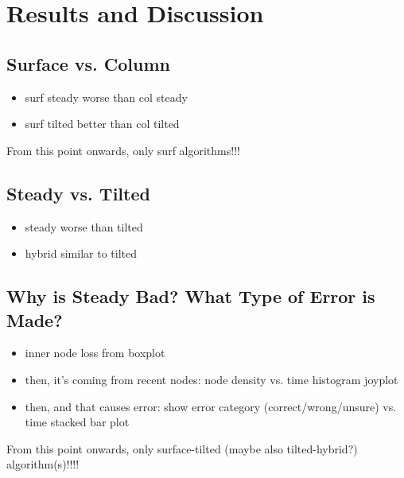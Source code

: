 \section{Results and Discussion} \label{sec:results}





\subsection{Surface vs. Column} \label{sec:surface-vs-column}



\begin{itemize}
    \item surf steady worse than col steady
    \item surf tilted better than col tilted
\end{itemize}

From this point onwards, only surf algorithms!!!

\subsection{Steady vs. Tilted} \label{sec:steady-vs-tilted}
\begin{itemize}
    \item steady worse than tilted
    \item hybrid similar to tilted
\end{itemize}



\subsection{Why is Steady Bad? What Type of Error is Made?} \label{sec:error-analysis}
\begin{itemize}
    \item inner node loss from boxplot
    \item then, it's coming from recent nodes: node density vs. time histogram joyplot
    \item then, and that causes error: show error category (correct/wrong/unsure) vs. time stacked bar plot
\end{itemize}

From this point onwards, only surface-tilted (maybe also tilted-hybrid?) algorithm(s)!!!!

